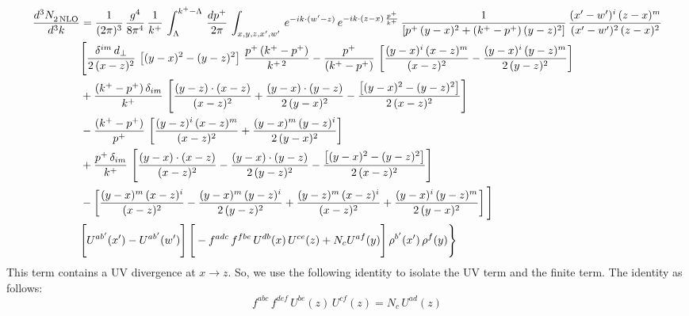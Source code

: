 \documentclass[9pt]{article}
\numberwithin{equation}{section}
\begin{document}
\begin{align}
    \frac{d^{3}N_{2\,\rm NLO}^{\rm}}{d^{3}k}  & =  \frac{1}{(2\pi)^{3}}\, \frac{g^{4}}{8\pi^{4}}\,\frac{1}{k^{+}}\,\int_{\Lambda}^{k^{+}-\Lambda}\, \frac{dp^{+}}{2\pi} \, \int_{x,y,z,x',w'}\,e^{-ik\cdot(w'-z)}\,e^{-ik\cdot (z-x)\,\frac{p^{+}}{k^{+}}}\,\frac{1}{\left[p^{+}\,(y-x)^{2}+(k^{+}-p^{+})\,(y-z)^{2}\right]}\, \frac{(x'-w')^{i}\,(z-x)^{m}}{(x'-w')^{2}\,(z-x)^{2}} \notag \\ & \Bigg[\frac{\delta^{im}\,d_{\perp}}{2\,(x-z)^{2}}\,\left[(y-x)^{2}-(y-z)^{2}\right]\,\frac{p^{+}\,(k^{+}-p^{+})}{k^{+\,2}}-\frac{p^{+}}{(k^{+}-p^{+})}\,\left[\frac{(y-x)^{i}\,(x-z)^{m}}{(x-z)^{2}}-\frac{(y-x)^{i}\,(y-z)^{m}}{2\,(y-z)^{2}}\right]\notag \\ & +\frac{(k^{+}-p^{+})\,\delta_{im}}{k^{+}}\,\left[\frac{(y-z)\cdot (x-z)}{(x-z)^{2}}+\frac{(y-x)\cdot (y-z)}{2\,(y-x)^{2}}-\frac{\left[(y-x)^{2}-(y-z)^{2}\right]}{2\,(x-z)^{2}}\right]\notag \\ & -\frac{(k^{+}-p^{+})}{p^{+}}\,\left[\frac{(y-z)^{i}\,(x-z)^{m}}{(x-z)^{2}}+\frac{(y-x)^{m}\,(y-z)^{i}}{2\,(y-x)^{2}}\right]\notag \\ & +\frac{p^{+}\,\delta_{im}}{k^{+}}\,\left[\frac{(y-x)\cdot (x-z)}{(x-z)^{2}}-\frac{(y-x)\cdot (y-z)}{2\,(y-z)^{2}}-\frac{\left[(y-x)^{2}-(y-z)^{2}\right]}{2\,(x-z)^{2}}\right]\notag \\ &-\left[\frac{(y-x)^{m}\,(x-z)^{i}}{(x-z)^{2}}-\frac{(y-x)^{m}\,(y-z)^{i}}{2\,(y-z)^{2}}+\frac{(y-z)^{m}\,(x-z)^{i}}{(x-z)^{2}}+\frac{(y-x)^{i}\,(y-z)^{m}}{2\,(y-x)^{2}}\right]\Bigg] \notag \\ & \Bigg[U^{ab'}(x')-U^{ab'}(w')\Bigg]\,\Bigg[-f^{adc}\,f^{fbe}\,U^{db}(x)\,U^{ce}(z)+N_{c}U^{af}(y)\Bigg]\,\rho^{b'}(x')\,\rho^{f}(y)\Bigg\}
\end{align}
This term contains a UV divergence at $x\rightarrow z$.  So, we use the following identity to isolate the UV term and the finite term. The identity as follows:
$$f^{abc}\,f^{def}\,U^{be}(z)\,U^{cf}(z) = N_{c}\,U^{ad}(z)$$
\end{document}
